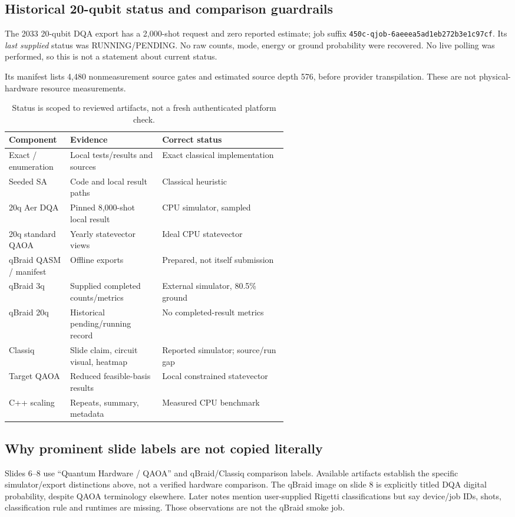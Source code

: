 \documentclass[11pt,letterpaper]{article}
\newcommand{\file}[1]{\nolinkurl{#1}}
\begin{document}
\subsection{Historical 20-qubit status and comparison guardrails}
The 2033 20-qubit DQA export has a 2,000-shot request and zero reported estimate; job suffix \file{450c-qjob-6aeeea5ad1eb272b3e1c97cf}. Its \emph{last supplied} status was RUNNING/PENDING. No raw counts, mode, energy or ground probability were recovered. No live polling was performed, so this is not a statement about current status.

Its manifest lists 4,480 nonmeasurement source gates and estimated source depth 576, before provider transpilation. These are not physical-hardware resource measurements.

\begin{table}[H]\centering\small
\begin{tabularx}{\linewidth}{@{}p{0.22\linewidth}p{0.33\linewidth}X@{}}\toprule
Component & Evidence & Correct status\\\midrule
Exact / enumeration & Local tests/results and sources & Exact classical implementation\\
Seeded SA & Code and local result paths & Classical heuristic\\
20q Aer DQA & Pinned 8,000-shot local result & CPU simulator, sampled\\
20q standard QAOA & Yearly statevector views & Ideal CPU statevector\\
qBraid QASM / manifest & Offline exports & Prepared, not itself submission\\
qBraid 3q & Supplied completed counts/metrics & External simulator, 80.5\% ground\\
qBraid 20q & Historical pending/running record & No completed-result metrics\\
Classiq & Slide claim, circuit visual, heatmap & Reported simulator; source/run gap\\
Target QAOA & Reduced feasible-basis results & Local constrained statevector\\
C++ scaling & Repeats, summary, metadata & Measured CPU benchmark\\\bottomrule
\end{tabularx}\caption{Status is scoped to reviewed artifacts, not a fresh authenticated platform check.}
\end{table}

\subsection{Why prominent slide labels are not copied literally}
Slides 6--8 use ``Quantum Hardware / QAOA'' and qBraid/Classiq comparison labels. Available artifacts establish the specific simulator/export distinctions above, not a verified hardware comparison. The qBraid image on slide 8 is explicitly titled DQA digital probability, despite QAOA terminology elsewhere. Later notes mention user-supplied Rigetti classifications but say device/job IDs, shots, classification rule and runtimes are missing. Those observations are not the qBraid smoke job.
\end{document}
